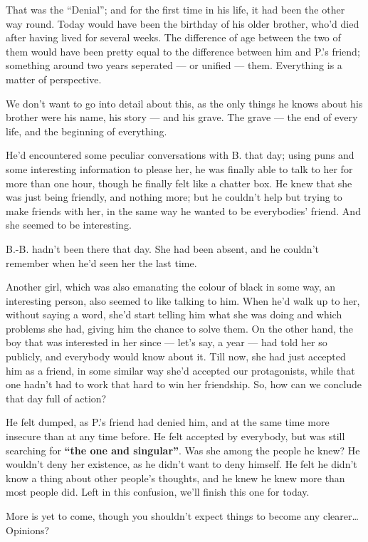 That was the \enquote{Denial}; and for the first time in his life, it had been the other way round. Today would have been the birthday of his older brother, who'd died after having lived for several weeks. 
The difference of age between the two of them would have been pretty equal to the difference between him and P.'s friend; something around two years seperated --- or unified --- them. 
Everything is a matter of perspective.

We don't want to go into detail about this, as the only things he knows about his brother were his name, his story --- and his grave. 
The grave --- the end of every life, and the beginning of everything.

He'd encountered some peculiar conversations with B. that day; using puns and some interesting information to please her, he was finally able to talk to her for more than one hour, though he finally felt like a chatter box. He knew that she was just being friendly, and nothing more; but he couldn't help but trying to make friends with her, in the same way he wanted to be everybodies' friend. And she seemed to be interesting.

B.-B. hadn't been there that day. She had been absent, and he couldn't remember when he'd seen her the last time.

Another girl, which was also emanating the colour of black in some way, an interesting person, also seemed to like talking to him. When he'd walk up to her, without saying a word, she'd start telling him what she was doing and which problems she had, giving him the chance to solve them. On the other hand, the boy that was interested in her since --- let's say, a year --- had told her so publicly, and everybody would know about it. Till now, she had just accepted him as a friend, in some similar way she'd accepted our protagonists, while that one hadn't had to work that hard to win her friendship. 
So, how can we conclude that day full of action?

He felt dumped, as P.'s friend had denied him, and at the same time more insecure than at any time before. 
He felt accepted by everybody, but was still searching for \textbf{\enquote{the one and singular}}. Was she among the people he knew? He wouldn't deny her existence, as he didn't want to deny himself. 
He felt he didn't know a thing about other people's thoughts, and he knew he knew more than most people did. 
Left in this confusion, we'll finish this one for today.

More is yet to come, though you shouldn't expect things to become any clearer\ldots
Opinions?

